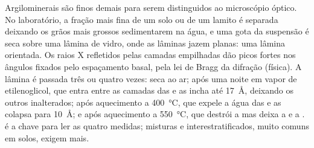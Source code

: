 \begin{inthelab}
Argilominerais são finos demais para serem distinguidos ao microscópio óptico. No laboratório, a fração mais fina de um solo ou de um lamito é separada deixando os grãos mais grossos sedimentarem na água, e uma gota da suspensão é seca sobre uma lâmina de vidro, onde as lâminas jazem planas: uma lâmina orientada. Os raios X refletidos pelas camadas empilhadas dão picos fortes nos ângulos fixados pelo espaçamento basal, pela lei de Bragg da difração (física). A lâmina é passada três ou quatro vezes: seca ao ar; após uma noite em vapor de etilenoglicol, que entra entre as camadas das  e as incha até \SI{17}{\angstrom}, deixando os outros  inalterados; após aquecimento a \SI{400}{\celsius}, que expele a água das  e as colapsa para \SI{10}{\angstrom}; e após aquecimento a \SI{550}{\celsius}, que destrói a  mas deixa a  e a .  é a chave para ler as quatro medidas; misturas e  interestratificados, muito comuns em solos, exigem mais.
\end{inthelab}

